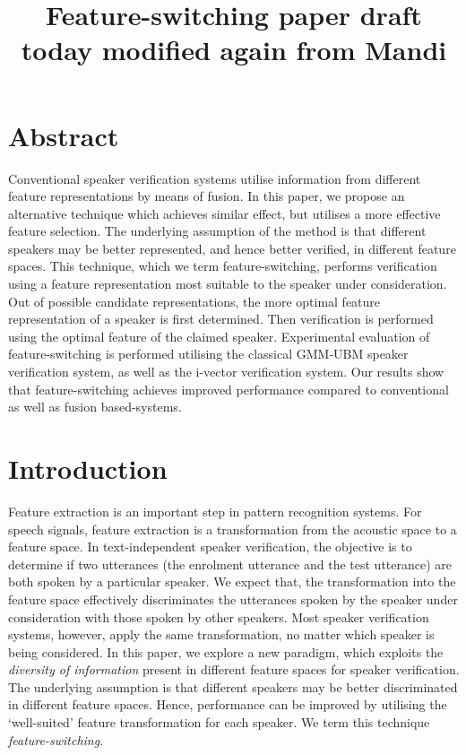 \documentclass{article}
\title{Feature-switching paper draft today modified again from Mandi}
\begin{document}
\section*{Abstract}

Conventional speaker verification systems utilise information from different
feature representations by means of fusion. In this paper, we propose an
alternative technique which achieves similar effect, but utilises a more
effective feature selection. The underlying assumption of the method is that
different speakers may be better represented, and hence better verified, in
different feature spaces.  This technique, which we term feature-switching,
performs verification using a feature representation most suitable to the
speaker under consideration. Out of possible candidate representations, the more
optimal feature representation of a speaker is first determined. Then
verification is performed using the optimal feature of the claimed speaker.
Experimental evaluation of feature-switching is performed utilising the
classical GMM-UBM speaker verification system, as well as the i-vector
verification system. Our results show that feature-switching achieves improved
performance compared to conventional as well as fusion based-systems.

\section{Introduction}
\label{sec:intro}
Feature extraction is an important step in pattern recognition systems. For
speech signals, feature extraction is a transformation from the acoustic space
to a feature space. In text-independent speaker verification, the objective is
to determine if two utterances (the enrolment utterance and the test utterance) are
both spoken by a particular speaker. We expect that, the transformation into the
feature space effectively discriminates the utterances spoken by the speaker
under consideration with those spoken by other speakers. Most speaker
verification systems, however, apply the same transformation, no matter which
speaker is being considered. In this paper, we explore a new paradigm, which
exploits the \emph{diversity of information} present in different feature spaces
for speaker verification. The underlying assumption is that different speakers
may be better discriminated in different feature spaces. Hence, performance can
be improved by utilising the `well-suited' feature transformation for
each speaker. We term this technique \emph{feature-switching}. 
\end{document}
